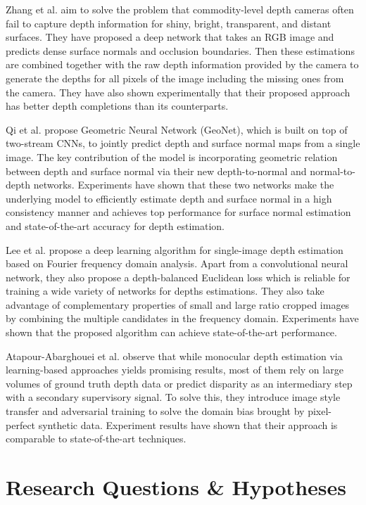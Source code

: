 \documentclass[12pt,twoside]{article}
\begin{document}
Zhang et al. \cite{yinda_zhang_deep_2018} aim to solve the problem that commodity-level depth cameras often fail to capture depth information for shiny, bright, transparent, and distant surfaces. They have proposed a deep network that takes an RGB image and predicts dense surface normals and occlusion boundaries. Then these estimations are combined together with the raw depth information provided by the camera to generate the depths for all pixels of the image including the missing ones from the camera. They have also shown experimentally that their proposed approach has better depth completions than its counterparts.

Qi et al. \cite{xiaojuan_qi_geonet:_2018} propose Geometric Neural Network (GeoNet), which is built on top of two-stream CNNs, to jointly predict depth and surface normal maps from a single image. The key contribution of the model is incorporating geometric relation between depth and surface normal via their new depth-to-normal and normal-to-depth networks. Experiments have shown that these two networks make the underlying model to efficiently estimate depth and surface normal in a high consistency manner and achieves top performance for surface normal estimation and state-of-the-art accuracy for depth estimation.

Lee et al. \cite{jae-han_lee_single-image_2018} propose a deep learning algorithm for single-image depth estimation based on Fourier frequency domain analysis. Apart from a convolutional neural network, they also propose a depth-balanced Euclidean loss which is reliable for training a wide variety of networks for depths estimations. They also take advantage of complementary properties of small and large ratio cropped images by combining the multiple candidates in the frequency domain. Experiments have shown that the proposed algorithm can achieve state-of-the-art performance.

Atapour-Abarghouei et al. \cite{amir_atapour-abarghouei_real-time_2018} observe that while monocular depth estimation via learning-based approaches yields promising results, most of them rely on large volumes of ground truth depth data or predict disparity as an intermediary step with a secondary supervisory signal. To solve this, they introduce image style transfer and adversarial training to solve the domain bias brought by pixel-perfect synthetic data. Experiment results have shown that their approach is comparable to state-of-the-art techniques.

\section{Research Questions \& Hypotheses}
\end{document}
